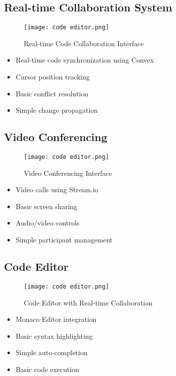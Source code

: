 \documentclass[12pt,a4paper]{report}
\begin{document}
\subsection{Real-time Collaboration System}
\begin{figure}[h!]
    \centering
    \texttt{[image: code editor.png]}
    \caption{Real-time Code Collaboration Interface}
    \label{fig:collab}
\end{figure}

\begin{itemize}
   \item Real-time code synchronization using Convex
   \item Cursor position tracking
   \item Basic conflict resolution
   \item Simple change propagation
\end{itemize}

\subsection{Video Conferencing}
\begin{figure}[h!]
    \centering
    \texttt{[image: code editor.png]}
    \caption{Video Conferencing Interface}
    \label{fig:video}
\end{figure}

\begin{itemize}
   \item Video calls using Stream.io
   \item Basic screen sharing
   \item Audio/video controls
   \item Simple participant management
\end{itemize}

\subsection{Code Editor}
\begin{figure}[h!]
    \centering
    \texttt{[image: code editor.png]}
    \caption{Code Editor with Real-time Collaboration}
    \label{fig:editor}
\end{figure}

\begin{itemize}
   \item Monaco Editor integration
   \item Basic syntax highlighting
   \item Simple auto-completion
   \item Basic code execution
\end{itemize}
\end{document}
